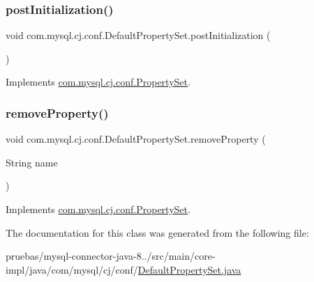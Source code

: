 \mbox{\label{classcom_1_1mysql_1_1cj_1_1conf_1_1_default_property_set_a56846f6e28845150a83181734f800215}} 
\subsubsection{\texorpdfstring{post\+Initialization()}{postInitialization()}}
{\footnotesize\ttfamily void com.\+mysql.\+cj.\+conf.\+Default\+Property\+Set.\+post\+Initialization (\begin{DoxyParamCaption}{ }\end{DoxyParamCaption})}



Implements \mbox{\hyperlink{interfacecom_1_1mysql_1_1cj_1_1conf_1_1_property_set_a1e590d8f29a11f3231099aa1c163f987}{com.\+mysql.\+cj.\+conf.\+Property\+Set}}.

\mbox{\label{classcom_1_1mysql_1_1cj_1_1conf_1_1_default_property_set_ae797c54a9e9152a4fd284bc96bc4e12f}} 
\subsubsection{\texorpdfstring{remove\+Property()}{removeProperty()}}
{\footnotesize\ttfamily void com.\+mysql.\+cj.\+conf.\+Default\+Property\+Set.\+remove\+Property (\begin{DoxyParamCaption}\item[{String}]{name }\end{DoxyParamCaption})}



Implements \mbox{\hyperlink{interfacecom_1_1mysql_1_1cj_1_1conf_1_1_property_set_a16cbf9f5d52969d0dbd690c5d43e1c46}{com.\+mysql.\+cj.\+conf.\+Property\+Set}}.



The documentation for this class was generated from the following file\+:\begin{DoxyCompactItemize}
\item 
pruebas/mysql-\/connector-\/java-\/8../src/main/core-\/impl/java/com/mysql/cj/conf/\mbox{\hyperlink{_default_property_set_8java}{Default\+Property\+Set.\+java}}\end{DoxyCompactItemize}

